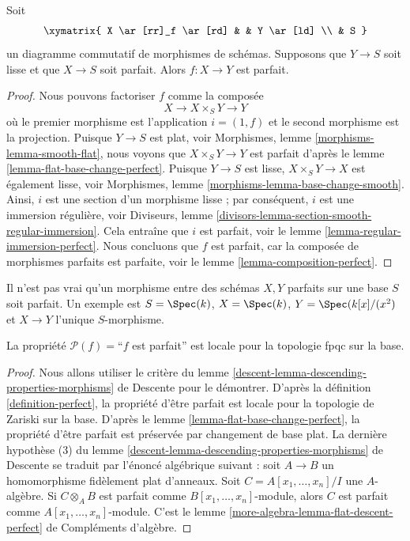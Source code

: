 \begin{lemma}
\label{lemma-perfect-permanence}
Soit
$$
\xymatrix{
X \ar[rr]_f \ar[rd] & & Y \ar[ld] \\
& S
}
$$
un diagramme commutatif de morphismes de schémas. Supposons que $Y \to S$ soit
lisse et que $X \to S$ soit parfait. Alors $f : X \to Y$ est parfait.
\end{lemma}

\begin{proof}
Nous pouvons factoriser $f$ comme la composée
$$
X \longrightarrow X \times_S Y \longrightarrow Y
$$
où le premier morphisme est l'application $i = (1, f)$ et le second
morphisme est la projection. Puisque $Y \to S$ est plat, voir
Morphismes, lemme \ref{morphisms-lemma-smooth-flat},
nous voyons que $X \times_S Y \to Y$ est parfait d'après le
lemme \ref{lemma-flat-base-change-perfect}.
Puisque $Y \to S$ est lisse, $X \times_S Y \to X$ est également lisse, voir
Morphismes, lemme \ref{morphisms-lemma-base-change-smooth}.
Ainsi, $i$ est une section d'un morphisme lisse ; par conséquent, $i$ est
une immersion régulière, voir
Diviseurs, lemme \ref{divisors-lemma-section-smooth-regular-immersion}.
Cela entraîne que $i$ est parfait, voir le
lemme \ref{lemma-regular-immersion-perfect}.
Nous concluons que $f$ est parfait, car la composée de morphismes
parfaits est parfaite, voir le
lemme \ref{lemma-composition-perfect}.
\end{proof}

\begin{remark}
\label{remark-perfect-permanence}
Il n'est pas vrai qu'un morphisme entre des schémas $X, Y$ parfaits sur une base $S$
soit parfait. Un exemple est $S = \Spec(k)$, $X = \Spec(k)$,
$Y = \Spec(k[x]/(x^2)$ et $X \to Y$ l'unique $S$-morphisme.
\end{remark}

\begin{lemma}
\label{lemma-descending-property-perfect}
La propriété $\mathcal{P}(f) =$``$f$ est parfait''
est locale pour la topologie fpqc sur la base.
\end{lemma}

\begin{proof}
Nous allons utiliser le critère du
lemme \ref{descent-lemma-descending-properties-morphisms} de Descente
pour le démontrer. D'après la
définition \ref{definition-perfect},
la propriété d'être parfait est locale pour la topologie de Zariski sur la base. D'après le
lemme \ref{lemma-flat-base-change-perfect},
la propriété d'être parfait est préservée par changement de base plat.
La dernière hypothèse (3) du
lemme \ref{descent-lemma-descending-properties-morphisms} de Descente
se traduit par l'énoncé algébrique suivant :
soit $A \to B$ un homomorphisme fidèlement plat d'anneaux.
Soit $C = A[x_1, \ldots, x_n]/I$ une $A$-algèbre.
Si $C \otimes_A B$ est parfait comme $B[x_1, \ldots, x_n]$-module,
alors $C$ est parfait comme $A[x_1, \ldots, x_n]$-module.
C'est le
lemme \ref{more-algebra-lemma-flat-descent-perfect} de Compléments d'algèbre.
\end{proof}

